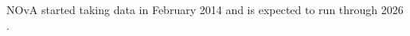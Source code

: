 \gls{NOvA} started taking data in February 2014 and is expected to run through 2026 \cite{NOvAHalfTimeOverview2022.pdf}.


